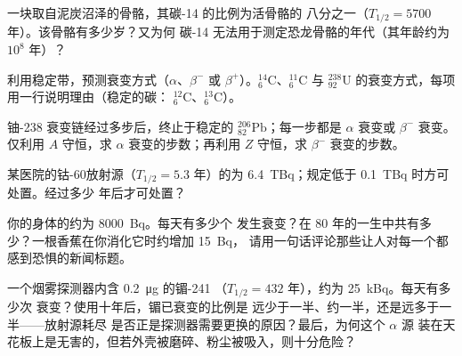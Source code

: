 \begin{exercise}[$\star\star$]\label{exo:g11:nucleus-radioactivity:10}
一块取自泥炭沼泽的骨骼，其碳-14 的比例为活骨骼的
八分之一（$T_{1/2} = \num{5700}$ 年）。该骨骼有多少岁？又为何
碳-14 无法用于测定恐龙骨骼的年代（其年龄约为 $10^{8}$ 年）？
\end{exercise}

\begin{exercise}[$\star\star$]\label{exo:g11:nucleus-radioactivity:11}
利用稳定带，预测衰变方式（$\alpha$、$\beta^-$ 或
$\beta^+$）。${}^{14}_{6}\mathrm{C}$、${}^{11}_{6}\mathrm{C}$ 与
${}^{238}_{92}\mathrm{U}$ 的衰变方式，每项用一行说明理由（稳定的碳：
${}^{12}_{6}\mathrm{C}$、${}^{13}_{6}\mathrm{C}$）。
\end{exercise}

\begin{exercise}[$\star\star\star$]\label{exo:g11:nucleus-radioactivity:12}
铀-238 衰变链经过多步后，终止于稳定的
${}^{206}_{82}\mathrm{Pb}$；每一步都是 $\alpha$ 衰变或 $\beta^-$ 衰变。仅利用
$A$ 守恒，求 $\alpha$ 衰变的步数；再利用
$Z$ 守恒，求 $\beta^-$ 衰变的步数。
\end{exercise}

\begin{exercise}[$\star\star\star$]\label{exo:g11:nucleus-radioactivity:13}
某医院的钴-60放射源（$T_{1/2} = 5.3$ 年）的为
\qty{6.4}{TBq}；规定低于 \qty{0.1}{TBq} 时方可处置。经过多少
年后才可处置？
\end{exercise}

\begin{exercise}[$\star\star\star$]\label{exo:g11:nucleus-radioactivity:14}
你的身体的约为 \qty{8000}{Bq}。每天有多少个
发生衰变？在 $80$ 年的一生中共有多少？一根香蕉在你消化它时约增加 \qty{15}{Bq}，
请用一句话评论那些让人对每一个都感到恐惧的新闻标题。
\end{exercise}

\begin{exercise}[$\star\star\star$]\label{exo:g11:nucleus-radioactivity:15}
一个烟雾探测器内含 \qty{0.2}{\micro\gram} 的镅-241
（$T_{1/2} = 432$ 年），约为 \qty{25}{kBq}。每天有多少次
衰变？使用十年后，镅已衰变的比例是
远少于一半、约一半，还是远多于一半——放射源耗尽
是否正是探测器需要更换的原因？最后，为何这个 $\alpha$ 源
装在天花板上是无害的，但若外壳被磨碎、粉尘被吸入，则十分危险？
\end{exercise}

